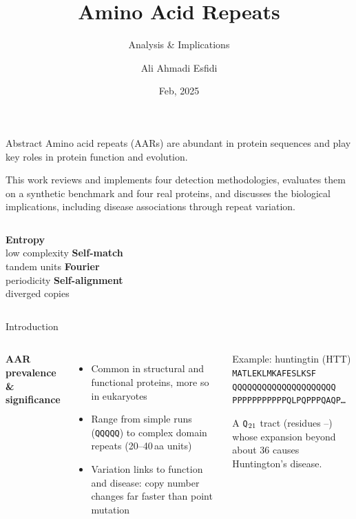 \documentclass[aspectratio=169,11pt]{beamer}
\title{Amino Acid Repeats}
\subtitle{Analysis \& Implications}
\author{Ali Ahmadi Esfidi}
\date{Feb, 2025}
\newcommand{\seq}[1]{\texttt{#1}}
\newcommand{\muted}[1]{\textcolor{inkmuted}{#1}}
\begin{document}
\maketitle

\begin{frame}{Abstract}
\vfill
Amino acid repeats (AARs) are abundant in protein sequences and play key roles in protein
function and evolution.

\medskip
This work reviews and implements \alert{four detection methodologies}, evaluates them on a synthetic
benchmark and four real proteins, and discusses the biological implications, including disease associations
through repeat variation.
\vfill
\begin{columns}[T]
\centering\textbf{\color{accent2}Entropy}\\\muted{\small low complexity}
\centering\textbf{\color{accent}Self-match}\\\muted{\small tandem units}
\centering\textbf{\color{accent3}Fourier}\\\muted{\small periodicity}
\centering\textbf{\color{accent4}Self-alignment}\\\muted{\small diverged copies}
\end{columns}
\vfill
\end{frame}

\begin{frame}{Introduction}
\begin{columns}[T]
\textbf{AAR prevalence \& significance}
\begin{itemize}
  \item Common in structural and functional proteins, more so in eukaryotes
  \item Range from \alert{simple runs} (\seq{QQQQQ}) to \alert{complex domain repeats} (20--40\,aa units)
  \item Variation links to \alert{function and disease}: copy number changes far faster than point mutation
\end{itemize}
\begin{block}{Example: huntingtin (HTT)}
\small
\seq{MATLEKLMKAFESLKSF}\\
\seq{\textcolor{accent2}{QQQQQQQQQQQQQQQQQQQQQ}}\\
\seq{\textcolor{accent}{PPPPPPPPPPP}QLPQPPPQAQP\dots}

\medskip
A \seq{Q$_{21}$} tract (residues \httQStart--\httQEnd) whose expansion beyond about 36 causes Huntington's disease.
\end{block}
\end{columns}
\end{frame}
\end{document}

